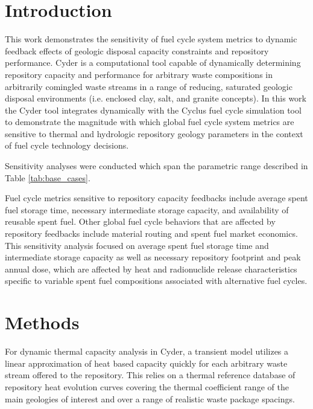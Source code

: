 
\section{Introduction}

This work demonstrates the sensitivity of fuel cycle system metrics to dynamic 
feedback effects of geologic disposal capacity constraints and repository performance. Cyder 
\cite{huff_cyder_2013} is a computational tool capable of dynamically 
determining repository capacity and performance for arbitrary waste compositions 
in arbitrarily comingled waste streams in a range of reducing, saturated 
geologic disposal environments (i.e.  enclosed clay, salt, and granite 
concepts). In this work the Cyder tool integrates dynamically with the  Cyclus 
fuel cycle simulation tool \cite{wilson_cyclus:_2012} to demonstrate the 
magnitude with which global fuel cycle system metrics are sensitive to thermal 
and hydrologic repository geology parameters in the context of fuel cycle 
technology decisions.

Sensitivity analyses were conducted which span the parametric range described in Table 
\ref{tab:base_cases}.



Fuel cycle metrics sensitive to repository capacity feedbacks include average spent fuel storage time, necessary 
intermediate storage capacity, and availability of reusable spent fuel. Other 
global fuel cycle behaviors that are affected by repository feedbacks include 
material routing and spent fuel market economics. This sensitivity analysis 
focused on average spent fuel storage time and intermediate storage capacity as 
well as necessary repository footprint and peak annual dose, which are affected 
by heat and radionuclide release characteristics specific to variable spent fuel 
compositions associated with alternative fuel cycles.  


\section{Methods}


For dynamic thermal capacity analysis in Cyder, a transient model utilizes a 
linear approximation of heat based capacity quickly for each 
arbitrary waste stream offered to the repository. This relies on a thermal reference database of repository heat 
evolution curves covering the thermal coefficient range of the main geologies of 
interest and over a range of realistic waste package spacings. 

